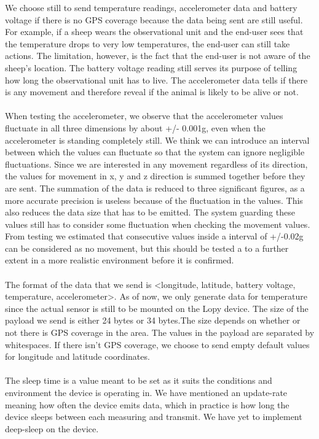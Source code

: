 		We choose still to send temperature readings, accelerometer data and battery voltage if there is no GPS coverage because the data being sent are still useful. For example, if a sheep wears the observational unit and the end-user sees that the temperature drops to very low temperatures, the end-user can still take actions. The limitation, however, is the fact that the end-user is not aware of the sheep’s location. The battery voltage reading still serves its purpose of telling how long the observational unit has to live. The accelerometer data tells if there is any movement and therefore reveal if the animal is likely to be alive or not. 
		\\\\
		 When testing the accelerometer, we observe that the accelerometer values fluctuate in all three dimensions by about +/- 0.001g, even when the accelerometer is standing completely still. We think we can introduce an interval between which the values can fluctuate so that the system can ignore negligible fluctuations. Since we are interested in any movement regardless of its direction, the values for movement in x, y and z direction is summed together before they are sent. The summation of the data is reduced to three significant figures, as a more accurate precision is useless because of the fluctuation in the values. This also reduces the data size that has to be emitted. The system guarding these values still has to consider some fluctuation when checking the movement values. From testing we estimated that consecutive values inside a interval of +/-0.02g can be considered as no movement, but this should be tested a to a further extent in a more realistic environment before it is confirmed.
		 \\\\
		 The format of the data that we send is <longitude, latitude, battery voltage, temperature, accelerometer>. As of now, we only generate data for temperature since the actual sensor is still to be mounted on the Lopy device. The size of the payload we send is either 24 bytes or 34 bytes.The size depends on whether or not there is GPS coverage in the area. The values in the payload are separated by whitespaces. If there isn’t GPS coverage, we choose to send empty default values for longitude and latitude coordinates.\\\\
		 The sleep time is a value meant to be set as it suits the conditions and environment the device is operating in. We have mentioned an update-rate meaning how often the device emits data, which in practice is how long the device sleeps between each measuring and transmit. We have yet to implement deep-sleep on the device.  
	
